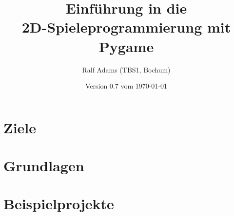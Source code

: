 \documentclass[a4paper,12pt,twoside]{scrreprt}
\begin{document}
  \title{Einführung in die\\2D-Spieleprogrammierung mit Pygame}
  \author{Ralf Adams (TBS1, Bochum)}
  \date{Version 0.7 vom \today}
  \maketitle
  \tableofcontents

\setlength{\parindent}{0.0em}
\setlength{\parskip}{1.0ex plus0.5ex minus0.5ex}
\setlength{\itemsep}{-0.3ex plus0.2ex}


\chapter{Ziele}
\chapter{Grundlagen}\label{secGrundlagen}














\chapter{Beispielprojekte}


\listoffigures

\printglossaries
\printindex
{}
\end{document}
